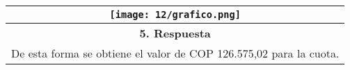 \begin{center}
\begin{longtable}[H]{|p{0.3\linewidth}|p{0.7\linewidth}|}
  \multicolumn{2}{|c|}{ \texttt{[image: 12/grafico.png]}}                                                                                                     \\ \hline
  \multicolumn{2}{|c|}{\cellcolor[HTML]{FFB183}\textbf{5. Respuesta}}                                                                                                                                   \\ \hline
  \multicolumn{2}{|c|}{De esta forma se obtiene el valor de  COP 126.575,02 para la cuota.}                                                                                                                \\ \hline
 \end{longtable}
\end{center}




